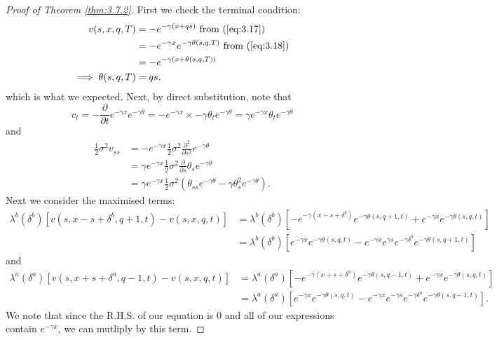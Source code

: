\begin{proof}[Proof of Theorem \ref{thm:3.7.2}]
    First we check the terminal condition:
    \begin{align*}
        v(s,x,q,T)&=-e^{-\gamma(x+qs)}\textrm{ from (\ref{eq:3.17})}\\
        &=-e^{-\gamma x}e^{-\gamma\theta(s,q,T)}\textrm{ from (\ref{eq:3.18})}\\
        &=-e^{-\gamma(x+\theta(s,q,T))}\\
        \implies \theta(s,q,T)&=qs.
    \end{align*}
    which is what we expected. Next, by direct substitution, note that
    \begin{equation*}
        v_t = -\frac{\partial}{\partial t}e^{-\gamma x}e^{-\gamma\theta}=-e^{-\gamma x}\times-\gamma\theta_te^{-\gamma\theta}=\gamma e^{-\gamma x}\theta_te^{-\gamma\theta}
    \end{equation*}
    and 
    \begin{align*}
        \frac{1}{2}\sigma^2v_{ss}&=-e^{-\gamma x}\frac{1}{2}\sigma^2\frac{\partial^2}{\partial s^2}e^{-\gamma\theta}\\
        &=\gamma e^{-\gamma x}\frac{1}{2}\sigma^2\frac{\partial}{\partial s}\theta_se^{-\gamma\theta}\\
        &=\gamma e^{-\gamma x}\frac{1}{2}\sigma^2\left(\theta_{ss}e^{-\gamma\theta}-\gamma\theta_s^2e^{-\gamma\theta}\right).
    \end{align*}
    Next we consider the maximised terms:
    \begin{align*}
        \lambda^b(\delta^b)[v(s,x-s+\delta^b,q+1,t)-v(s,x,q,t)]&=\lambda^b(\delta^b)[-e^{-\gamma (x-s+\delta^b)}e^{-\gamma\theta(s,q+1,t)}+e^{-\gamma x}e^{-\gamma\theta(s,q,t)}]\\
        &=\lambda^b(\delta^b)[e^{-\gamma x}e^{-\gamma\theta(s,q,t)}-e^{-\gamma x}e^{\gamma s}e^{-\gamma \delta^b}e^{-\gamma\theta(s,q+1,t)}]
    \end{align*}
    and
    \begin{align*}
        \lambda^a(\delta^a)[v(s,x+s+\delta^a,q-1,t)-v(s,x,q,t)]&=\lambda^a(\delta^a)[-e^{-\gamma (x+s+\delta^a)}e^{-\gamma\theta(s,q-1,t)}+e^{-\gamma x}e^{-\gamma\theta(s,q,t)}]\\
        &=\lambda^a(\delta^a)[e^{-\gamma x}e^{-\gamma\theta(s,q,t)}-e^{-\gamma x}e^{-\gamma s}e^{-\gamma\delta^a}e^{-\gamma\theta(s,q-1,t)}].
    \end{align*}
    We note that since the R.H.S. of our equation is 0 and all of our 
    expressions contain $e^{-\gamma x}$, we can mutliply by this term.

\end{proof}
